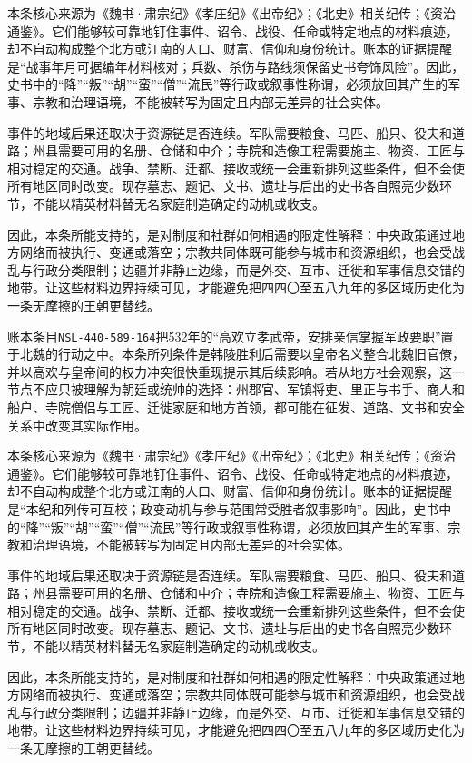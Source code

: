本条核心来源为《魏书·肃宗纪》《孝庄纪》《出帝纪》；《北史》相关纪传；《资治通鉴》。它们能够较可靠地钉住事件、诏令、战役、任命或特定地点的材料痕迹，却不自动构成整个北方或江南的人口、财富、信仰和身份统计。账本的证据提醒是“战事年月可据编年材料核对；兵数、杀伤与路线须保留史书夸饰风险”。因此，史书中的“降”“叛”“胡”“蛮”“僧”“流民”等行政或叙事性称谓，必须放回其产生的军事、宗教和治理语境，不能被转写为固定且内部无差异的社会实体。

事件的地域后果还取决于资源链是否连续。军队需要粮食、马匹、船只、役夫和道路；州县需要可用的名册、仓储和中介；寺院和造像工程需要施主、物资、工匠与相对稳定的交通。战争、禁断、迁都、接收或统一会重新排列这些条件，但不会使所有地区同时改变。现存墓志、题记、文书、遗址与后出的史书各自照亮少数环节，不能以精英材料替无名家庭制造确定的动机或收支。

因此，本条所能支持的，是对制度和社群如何相遇的限定性解释：中央政策通过地方网络而被执行、变通或落空；宗教共同体既可能参与城市和资源组织，也会受战乱与行政分类限制；边疆并非静止边缘，而是外交、互市、迁徙和军事信息交错的地带。让这些材料边界持续可见，才能避免把四四〇至五八九年的多区域历史化为一条无摩擦的王朝更替线。

账本条目\texttt{NSL-440-589-164}把532年的“高欢立孝武帝，安排亲信掌握军政要职”置于北魏的行动之中。本条所列条件是韩陵胜利后需要以皇帝名义整合北魏旧官僚，并以高欢与皇帝间的权力冲突很快重现提示其后续影响。若从地方社会观察，这一节点不应只被理解为朝廷或统帅的选择：州郡官、军镇将吏、里正与书手、商人和船户、寺院僧侣与工匠、迁徙家庭和地方首领，都可能在征发、道路、文书和安全关系中改变其实际作用。

本条核心来源为《魏书·肃宗纪》《孝庄纪》《出帝纪》；《北史》相关纪传；《资治通鉴》。它们能够较可靠地钉住事件、诏令、战役、任命或特定地点的材料痕迹，却不自动构成整个北方或江南的人口、财富、信仰和身份统计。账本的证据提醒是“本纪和列传可互校；政变动机与参与范围常受胜者叙事影响”。因此，史书中的“降”“叛”“胡”“蛮”“僧”“流民”等行政或叙事性称谓，必须放回其产生的军事、宗教和治理语境，不能被转写为固定且内部无差异的社会实体。

事件的地域后果还取决于资源链是否连续。军队需要粮食、马匹、船只、役夫和道路；州县需要可用的名册、仓储和中介；寺院和造像工程需要施主、物资、工匠与相对稳定的交通。战争、禁断、迁都、接收或统一会重新排列这些条件，但不会使所有地区同时改变。现存墓志、题记、文书、遗址与后出的史书各自照亮少数环节，不能以精英材料替无名家庭制造确定的动机或收支。

因此，本条所能支持的，是对制度和社群如何相遇的限定性解释：中央政策通过地方网络而被执行、变通或落空；宗教共同体既可能参与城市和资源组织，也会受战乱与行政分类限制；边疆并非静止边缘，而是外交、互市、迁徙和军事信息交错的地带。让这些材料边界持续可见，才能避免把四四〇至五八九年的多区域历史化为一条无摩擦的王朝更替线。

